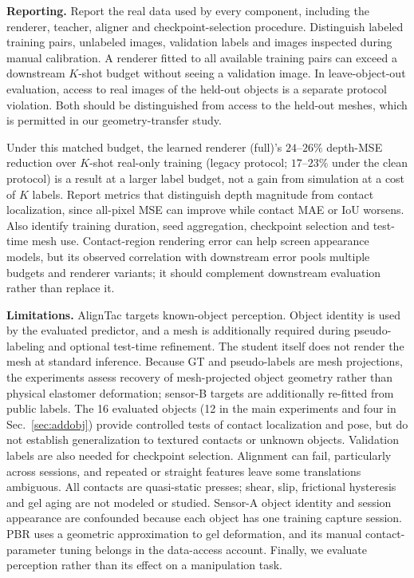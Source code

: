 \noindent\textbf{Reporting.}
Report the real data used by every component, including the renderer, teacher, aligner and checkpoint-selection procedure. Distinguish labeled training pairs, unlabeled images, validation labels and images inspected during manual calibration. A renderer fitted to all available training pairs can exceed a downstream $K$-shot budget without seeing a validation image. In leave-object-out evaluation, access to real images of the held-out objects is a separate protocol violation. Both should be distinguished from access to the held-out meshes, which is permitted in our geometry-transfer study.

Under this matched budget, the learned renderer (full)'s $24$--$26\%$ depth-MSE reduction over $K$-shot real-only training (legacy protocol; $17$--$23\%$ under the clean protocol) is a result at a larger label budget, not a gain from simulation at a cost of $K$ labels. Report metrics that distinguish depth magnitude from contact localization, since all-pixel MSE can improve while contact MAE or IoU worsens. Also identify training duration, seed aggregation, checkpoint selection and test-time mesh use. Contact-region rendering error can help screen appearance models, but its observed correlation with downstream error pools multiple budgets and renderer variants; it should complement downstream evaluation rather than replace it.

\noindent\textbf{Limitations.} AlignTac targets known-object perception. Object identity is used by the evaluated predictor, and a mesh is additionally required during pseudo-labeling and optional test-time refinement. The student itself does not render the mesh at standard inference. Because GT and pseudo-labels are mesh projections, the experiments assess recovery of mesh-projected object geometry rather than physical elastomer deformation; sensor-B targets are additionally re-fitted from public labels. The 16 evaluated objects (12 in the main experiments and four in Sec.~\ref{sec:addobj}) provide controlled tests of contact localization and pose, but do not establish generalization to textured contacts or unknown objects. Validation labels are also needed for checkpoint selection. Alignment can fail, particularly across sessions, and repeated or straight features leave some translations ambiguous. All contacts are quasi-static presses; shear, slip, frictional hysteresis and gel aging are not modeled or studied. Sensor-A object identity and session appearance are confounded because each object has one training capture session. PBR uses a geometric approximation to gel deformation, and its manual contact-parameter tuning belongs in the data-access account. Finally, we evaluate perception rather than its effect on a manipulation task.

